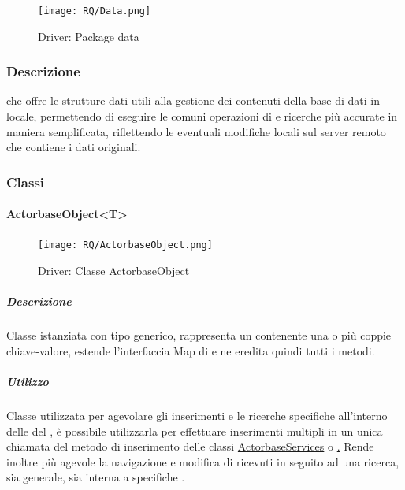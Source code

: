 \documentclass{scalatekids-article}
\begin{document}
\begin{figure}[H]
  \begin{center}
    \texttt{[image: RQ/Data.png]}
    \caption{Driver: Package data}
  \end{center}
\end{figure}

\subsubsection{Descrizione}

 che offre le strutture dati utili alla gestione dei contenuti
della base di dati in locale, permettendo di eseguire le comuni operazioni di
 e ricerche più accurate in maniera semplificata, riflettendo le
eventuali modifiche locali sul server remoto che contiene i dati originali.

\subsubsection{Classi}

\paragraph{ActorbaseObject<T>}
\label{sec:actorbase::driver::data::ActorbaseObject}

\begin{figure}[H]
  \begin{center}
    \texttt{[image: RQ/ActorbaseObject.png]}
    \caption{Driver: Classe ActorbaseObject}
  \end{center}
\end{figure}

\subparagraph{Descrizione}

Classe istanziata con tipo generico, rappresenta un  contenente una
o più coppie chiave-valore, estende l'interfaccia Map di  e ne
eredita quindi tutti i metodi.

\subparagraph{Utilizzo}

Classe utilizzata per agevolare gli inserimenti e le ricerche specifiche
all'interno delle  del , è possibile
utilizzarla per effettuare inserimenti multipli in un unica chiamata del metodo
di inserimento delle classi
\hyperref[sec:actorbase::driver::ActorbaseServices]{ActorbaseServices} o
\hyperref[sec:actorbase::driver::data::ActorbaseCollection]. Rende inoltre più
agevole la navigazione e modifica di  ricevuti in seguito ad una
ricerca, sia generale, sia interna a specifiche .
\end{document}
